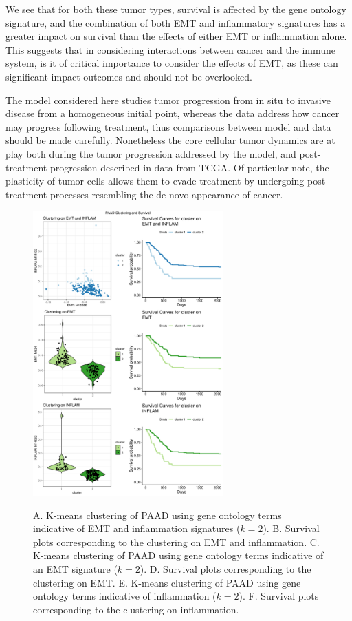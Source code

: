 \documentclass[11pt]{article}
\begin{document}
We see that for both these tumor types, survival is affected by the gene ontology signature, and the combination of both EMT and inflammatory signatures has a greater impact on survival than the effects of either EMT or inflammation alone.
This suggests that in considering interactions between cancer and the immune system, is it of critical importance to consider the effects of EMT, as these can significant impact outcomes and should not be overlooked. 
\par
The model considered here studies tumor progression from in situ to invasive disease from a homogeneous initial point, whereas the data address how cancer may progress following treatment, thus comparisons between model and data should be made carefully. Nonetheless the core cellular tumor dynamics are at play
 both during the tumor progression addressed by the model, and post-treatment progression described in data from TCGA. Of particular note, the plasticity of tumor cells allows them to evade treatment by undergoing post-treatment processes resembling the de-novo appearance of cancer\cite{sanchez2018slow}.

\begin{figure}
\center
{\includegraphics[width=0.65\textwidth]{Figure6/PAAD.pdf}}
\caption{A. K-means clustering of PAAD using gene ontology terms indicative of EMT and inflammation signatures ($k=2$).
B. Survival plots corresponding to the clustering on EMT and inflammation.
C. K-means clustering of PAAD using gene ontology terms indicative of an EMT signature ($k=2$).
D. Survival plots corresponding to the clustering on EMT.
E. K-means clustering of PAAD using gene ontology terms indicative of inflammation ($k=2$).
F. Survival plots corresponding to the clustering on inflammation.}
\label{fig:PAAD}
\end{figure}
\end{document}
